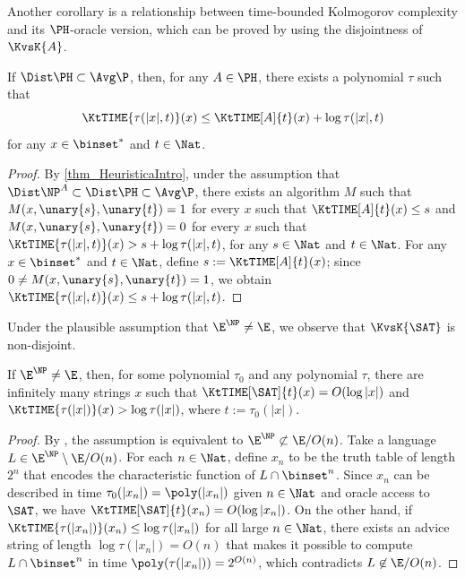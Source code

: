 \documentclass{toc}
\begin{document}
Another corollary is
a relationship between time-bounded Kolmogorov complexity
and its $\PH$-oracle version,
which can be proved by using the disjointness of $\KvsK{A}$.
\begin{corollary}
  \label{cor:oracle elimination}
  If $\Dist\PH \subset \Avg\P$,
  then,
  for any $A \in \PH$,
  there exists a polynomial $\tau$ such that
  $$\KtTIME{\tau(|x|, t)}(x) \le \KtTIME[A]{t}(x) + \log \tau(|x|, t)$$
  for any $x \in \binset^*$ and $t \in \Nat$.
\end{corollary}
\begin{proof}
  By \cref{thm_HeuristicaIntro},
  under the assumption that $\Dist\NP^A \subset \Dist\PH \subset \Avg\P$,
  there exists an algorithm $M$ such that
  $M(x, \unary{s}, \unary{t}) = 1$ for every $x$ such that $\KtTIME[A]{t}(x) \le s$
  and
  $M(x, \unary{s}, \unary{t}) = 0$ for every $x$ such that $\KtTIME{\tau(|x|, t)}(x) > s + \log \tau(|x|, t)$,
  for any $s \in \Nat$ and $t \in \Nat$.
  For any $x \in \binset^*$ and $t \in \Nat$, define $s := \KtTIME[A]{t}(x)$;
  since $0 \neq M(x, \unary{s}, \unary{t}) = 1$, we obtain
  $\KtTIME{\tau(|x|, t)}(x) \le s + \log \tau(|x|, t)$.
\end{proof}


%
Under the plausible assumption that $\E^\NP \neq \E$,
we observe that $\KvsK{\SAT}$ is non-disjoint.
\begin{proposition}
  \label{prop_NondisjointKSATvsK}
  If $\E^\NP \neq \E$,
  then,
  for some polynomial $\tau_0$ and any polynomial $\tau$,
  there are infinitely many strings $x$
  such that
  $\KtTIME[\SAT]{t}(x) = O(\log |x|)$
  and
  $\KtTIME{\tau(|x|)}(x) > \log \tau(|x|)$,
  where $t := \tau_0(|x|)$.
\end{proposition}
\begin{proof}
  By \cite{BuhrmanH92_fsttcs_conf}, the assumption is equivalent to $\E^\NP \not\subset \E/O(n)$.
  Take a language $L \in \E^\NP \setminus \E/O(n)$.
  For each $n \in \Nat$,
  define $x_n$ to be the truth table of length $2^n$ that encodes the characteristic function of $L \cap \binset^n$.
  Since $x_n$ can be described in time $\tau_0(|x_n|) = \poly(|x_n|)$ given $n \in \Nat$ and oracle access to $\SAT$,
  we have $\KtTIME[\SAT]{t}(x_n) = O(\log |x_n|)$.
  On the other hand, if $\KtTIME{\tau(|x_n|)}(x_n) \le \log \tau(|x_n|)$ for all large $n \in \Nat$,
  there exists an advice string of length $\log \tau(|x_n|) = O(n)$ that
  makes it possible
  to compute $L \cap \binset^n$ in time $\poly(\tau(|x_n|)) = 2^{O(n)}$,
  which contradicts $L \not\in \E/O(n)$.
\end{proof}
\end{document}
